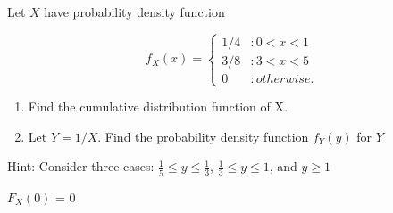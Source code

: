 \item Let $X$ have probability density function

\[f_X(x) = \left\{
  \begin{array}{lr}
    1/4 & : 0<x<1\\
    3/8 & : 3<x<5\\
    0 & : otherwise.
  \end{array}
\right.
\]

\begin{enumerate}[label=(\alph*)]
\item Find the cumulative distribution function of X.
\item Let $Y = 1/X$. Find the probability density function $f_Y(y)$ for $Y$
\end{enumerate}
Hint: Consider three cases: $ \frac{1}{5} \leq y \leq \frac{1}{3} $,
$ \frac{1}{3} \leq y \leq 1 $, and $ y \geq 1$

$F_X(0)$ = 0
